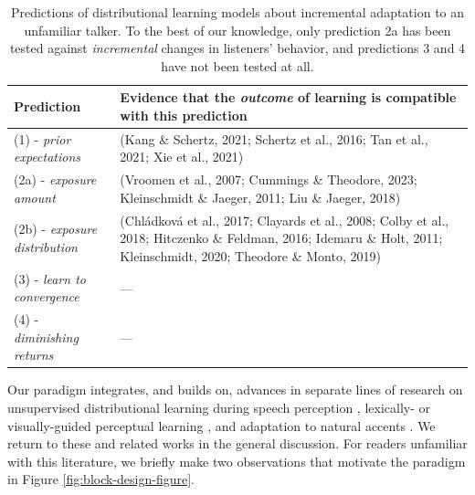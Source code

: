 \documentclass[
  11pt,
  man,mask,floatsintext]{apa6}
\begin{document}
\begin{table}[!ht]
\begin{small}
\begin{tabular}{p{}p{}}
\hline
Prediction & Evidence that the {\em outcome} of learning is compatible with this prediction \\
\hline
(1) - {\em prior expectations} & (Kang \& Schertz, 2021; Schertz et al., 2016; Tan et al., 2021; Xie et al., 2021) \\

(2a) - {\em exposure amount}  & (Vroomen et al., 2007; Cummings \& Theodore, 2023; Kleinschmidt \& Jaeger, 2011; Liu \& Jaeger, 2018) \\

(2b) - {\em exposure distribution} & (Chl\'adkov\'a et al., 2017; Clayards et al., 2008; Colby et al., 2018; Hitczenko \& Feldman, 2016; Idemaru \& Holt, 2011; Kleinschmidt, 2020; Theodore \& Monto, 2019) \\

(3) - {\em learn to convergence}  & --- \\

(4) - {\em diminishing returns} & --- \\

\hline
\end{tabular}
\caption{Predictions of distributional learning models about incremental adaptation to an unfamiliar talker. To the best of our knowledge, only prediction 2a has been tested against {\em incremental} changes in listeners' behavior, and predictions 3 and 4 have not been tested at all.}
\label{tab:predictions}
\end{small}
\end{table}

Our paradigm integrates, and builds on, advances in separate lines of research on unsupervised distributional learning during speech perception \autocite{clayards2008,colby2018,kleinschmidt2020,theodore-monto2019}, lexically- or visually-guided perceptual learning \autocites[LGPL/VGPL,][]{cummings-theodore2023,kleinschmidt-jaeger2012,vroomen2007}, and adaptation to natural accents \autocite{hitczenko-feldman2016,tan2021,xie2021cognition}. We return to these and related works in the general discussion. For readers unfamiliar with this literature, we briefly make two observations that motivate the paradigm in Figure \ref{fig:block-design-figure}.
\end{document}
